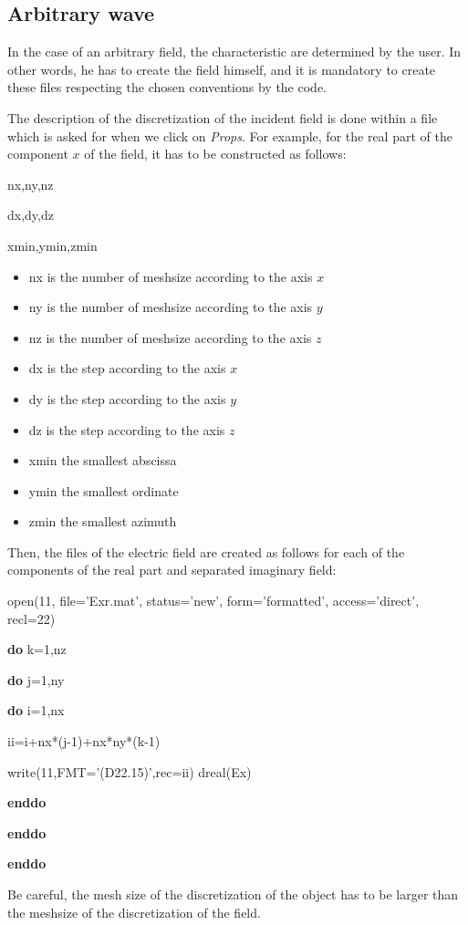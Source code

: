 \subsection{Arbitrary wave}

In the case of an arbitrary field, the characteristic are determined
by the user.  In other words, he has to create the field himself, and
it is mandatory to create these files respecting the chosen
conventions by the code.


The description of the discretization of the incident field is done 
within a file which is asked for when we click on {\it Props}.
For example, for the real part of the component $x$ of the field, 
it has to be constructed as follows:

nx,ny,nz 

dx,dy,dz

xmin,ymin,zmin

\begin{itemize}
\item  nx is the number of meshsize according to the axis $x$
\item  ny is the number of meshsize according to the axis $y$
\item  nz is the number of meshsize according to the axis $z$
\item  dx is the step according to the axis $x$
\item  dy is the step according to the axis $y$
\item  dz is the step according to the axis $z$
\item xmin the smallest abscissa
\item ymin the smallest ordinate
\item zmin the smallest azimuth
\end{itemize}

Then, the files of the electric field are created as follows for 
each of the components of the real part and separated imaginary field:

\vspace{10mm}

open(11, file='Exr.mat', status='new', form='formatted', access='direct', recl=22)

{\bf do} k=1,nz

\hspace{5mm} {\bf do} j=1,ny

\hspace{10mm} {\bf do} i=1,nx 

\hspace{15mm} ii=i+nx*(j-1)+nx*ny*(k-1)

\hspace{15mm} write(11,FMT='(D22.15)',rec=ii) dreal(Ex)

\hspace{10mm} {\bf enddo}

\hspace{5mm} {\bf enddo}

{\bf enddo}

\vspace{10mm}

Be careful, the mesh size of the discretization of the object has to
be larger than the meshsize of the discretization of the field.
